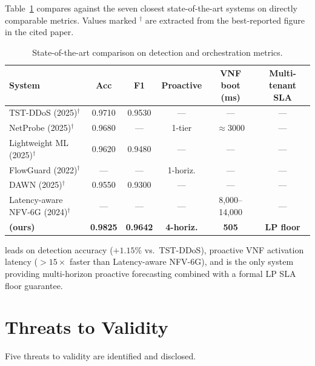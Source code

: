 Table~\ref{tab:sota} compares \padonap{} against the seven closest
state-of-the-art systems on directly comparable metrics. Values
marked $^\dagger$ are extracted from the best-reported figure in the
cited paper.

\begin{table}[H]
\centering
\footnotesize
\caption{State-of-the-art comparison on detection and orchestration metrics.}
\label{tab:sota}
\begin{tabular}{@{}lccccc@{}}
\toprule
System & Acc & F1 & Proactive & VNF boot (ms) & Multi-tenant SLA \\
\midrule
TST-DDoS (2025)$^\dagger$             & 0.9710 & 0.9530 & ---      & ---           & --- \\
NetProbe (2025)$^\dagger$             & 0.9680 & ---    & 1-tier   & $\approx$3000 & --- \\
Lightweight ML (2025)$^\dagger$       & 0.9620 & 0.9480 & ---      & ---           & --- \\
FlowGuard (2022)$^\dagger$            & ---    & ---    & 1-horiz. & ---           & --- \\
DAWN (2025)$^\dagger$                 & 0.9550 & 0.9300 & ---      & ---           & --- \\
Latency-aware NFV-6G (2024)$^\dagger$ & ---    & ---    & ---      & 8{,}000--14{,}000 & --- \\
\textbf{\padonap{} (ours)}
  & \textbf{0.9825}
  & \textbf{0.9642}
  & \textbf{4-horiz.}
  & \textbf{505}
  & \textbf{LP floor} \\
\bottomrule
\end{tabular}
\end{table}

\padonap{} leads on detection accuracy ($+1.15\%$ vs.\ TST-DDoS),
proactive VNF activation latency ($>15\times$ faster than Latency-aware
NFV-6G), and is the only system providing multi-horizon proactive
forecasting combined with a formal LP SLA floor guarantee.

\section{Threats to Validity}
\label{sec:validity}

Five threats to validity are identified and disclosed.


